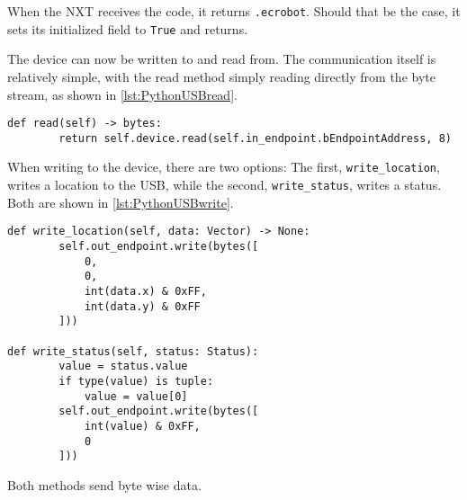 When the NXT receives the code, it returns \texttt{{.}ecrobot}.
Should that be the case, it sets its initialized field to \texttt{True} and returns.

The device can now be written to and read from.
The communication itself is relatively simple, with the read method simply reading directly from the byte stream, as shown in \autoref{lst:PythonUSBread}.

\begin{lstlisting}[label={lst:PythonUSBread},caption={Reading from the USB port connected to the NXT}]
def read(self) -> bytes:
        return self.device.read(self.in_endpoint.bEndpointAddress, 8)
\end{lstlisting}

When writing to the device, there are two options:
The first, \texttt{write\_location}, writes a location to the USB, while the second,  \texttt{write\_status}, writes a status.
Both are shown in \autoref{lst:PythonUSBwrite}.

\begin{lstlisting}[label={lst:PythonUSBwrite},caption={Reading from the USB port connected to the NXT}]
def write_location(self, data: Vector) -> None:
        self.out_endpoint.write(bytes([
            0,
            0,
            int(data.x) & 0xFF,
            int(data.y) & 0xFF
        ]))

def write_status(self, status: Status):
        value = status.value
        if type(value) is tuple:
            value = value[0]
        self.out_endpoint.write(bytes([
            int(value) & 0xFF,
            0
        ]))

\end{lstlisting}
Both methods send byte wise data.

